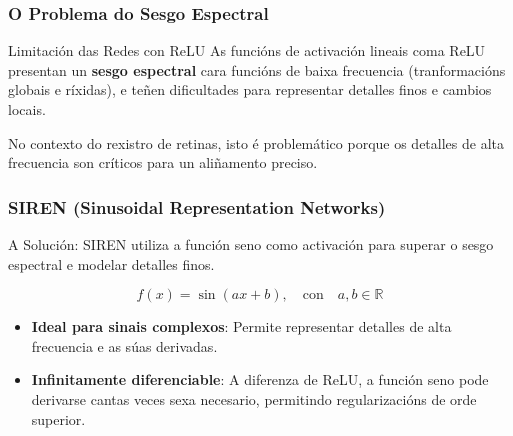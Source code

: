 \documentclass[xcolor=dvipsnames]{beamer}
\begin{document}
    \begin{frame}
        \frametitle{O Problema do Sesgo Espectral}

        \begin{block}{Limitación das Redes con ReLU}
            As funcións de activación lineais coma ReLU presentan un \textbf{sesgo espectral} cara funcións de baixa frecuencia (tranformacións globais e ríxidas), e teñen dificultades para representar detalles finos e cambios locais.
            
            \vspace{0.3cm}
            No contexto do rexistro de retinas, isto é problemático porque os detalles de alta frecuencia son críticos para un aliñamento preciso.
        \end{block}

    \end{frame}

    \begin{frame}
        \frametitle{SIREN (Sinusoidal Representation Networks)}

        \begin{alertblock}{A Solución: }
            SIREN utiliza a función seno como activación para superar o sesgo espectral e modelar detalles finos.
            
            \centering
            \[
            f(x) = \sin(ax + b), \quad \text{con} \quad a, b \in \mathbb{R}
            \]
            
            \begin{itemize}
                \item \textbf{Ideal para sinais complexos}: Permite representar detalles de alta frecuencia e as súas derivadas.
                \item \textbf{Infinitamente diferenciable}: A diferenza de ReLU, a función seno pode derivarse cantas veces sexa necesario, permitindo regularizacións de orde superior.
            \end{itemize}
        \end{alertblock}

    \end{frame}
\end{document}
